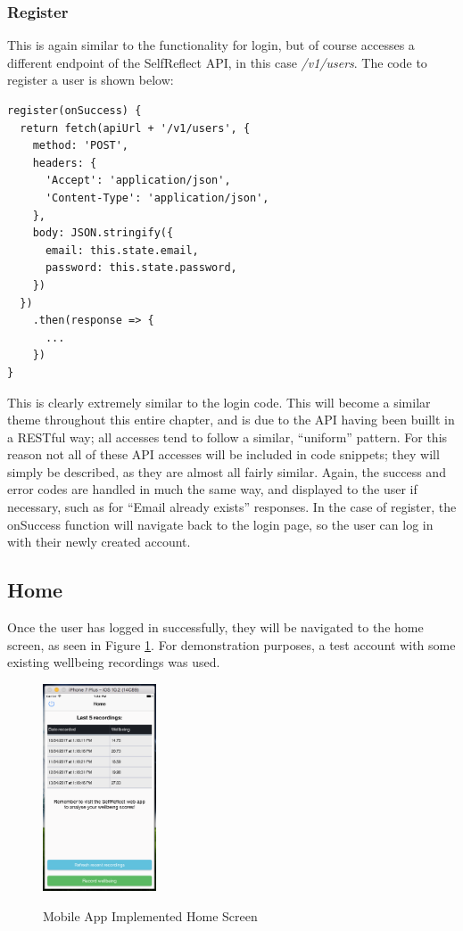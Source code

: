 \documentclass[11pt,openright,a4paper]{report}
\begin{document}
\newpage
\subsubsection{Register}
This is again similar to the functionality for login, but of course accesses a different endpoint of the SelfReflect API, in this case \emph{/v1/users}. The code to register a user is shown below:
\begin{lstlisting}
register(onSuccess) {
  return fetch(apiUrl + '/v1/users', {
    method: 'POST',
    headers: {
      'Accept': 'application/json',
      'Content-Type': 'application/json',
    },
    body: JSON.stringify({
      email: this.state.email,
      password: this.state.password,
    })
  })
    .then(response => {
      ...
    })
}
\end{lstlisting}

This is clearly extremely similar to the login code. This will become a similar theme throughout this entire chapter, and is due to the API having been buillt in a RESTful way; all accesses tend to follow a similar, \enquote{uniform} pattern. For this reason not all of these API accesses will be included in code snippets; they will simply be described, as they are almost all fairly similar. Again, the success and error codes are handled in much the same way, and displayed to the user if necessary, such as for \enquote{Email already exists} responses. In the case of register, the onSuccess function will navigate back to the login page, so the user can log in with their newly created account.

\subsection{Home}
Once the user has logged in successfully, they will be navigated to the home screen, as seen in Figure \ref{fig:mobilehomeimpl}. For demonstration purposes, a test account with some existing wellbeing recordings was used.

\begin{figure}[ht]
\centering
\caption{Mobile App Implemented Home Screen}
\includegraphics[width=0.3\textwidth]{i/mobilehomeimpl.png}
\label{fig:mobilehomeimpl}
\end{figure}
\end{document}
